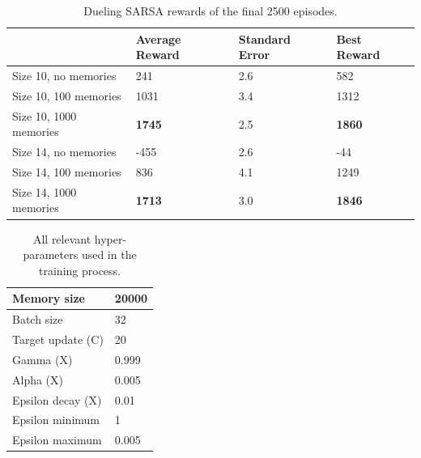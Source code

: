 \begin{table}[H]
\begin{tabular}{l|l|l|l|}
\cline{2-4}
\textbf{} & Average Reward & Standard Error & Best Reward \\ \hline
\multicolumn{1}{|l|}{Size 10, no memories} & 241 & 2.6 & 582 \\ \hline
\multicolumn{1}{|l|}{Size 10, 100 memories} & 1031 & 3.4 & 1312 \\ \hline
\multicolumn{1}{|l|}{Size 10, 1000 memories} & \textbf{1745} & 2.5 & \textbf{1860} \\ \hline
\multicolumn{1}{|l|}{Size 14, no memories} & -455 & 2.6 & -44 \\ \hline
\multicolumn{1}{|l|}{Size 14, 100 memories} & 836 & 4.1 & 1249 \\ \hline
\multicolumn{1}{|l|}{Size 14, 1000 memories} & \textbf{1713} & 3.0 & \textbf{1846} \\ \hline
\end{tabular}
\caption{Dueling SARSA rewards of the final 2500 episodes.}
\label{tab:2500duel}
\end{table}


\begin{table}[H]
\begin{tabular}{|l|l|}
\hline
Memory size & 20000 \\ \hline
Batch size & 32 \\ \hline
Target update (C) & 20 \\ \hline
Gamma (X) & 0.999 \\ \hline
Alpha (X) & 0.005 \\ \hline
Epsilon decay (X) & 0.01 \\ \hline
Epsilon minimum & 1 \\ \hline
Epsilon maximum & 0.005 \\ \hline
\end{tabular}
\caption{All relevant hyper-parameters used in the training process.}
\label{tab:hyperparameters}
\end{table}


\clearpage
